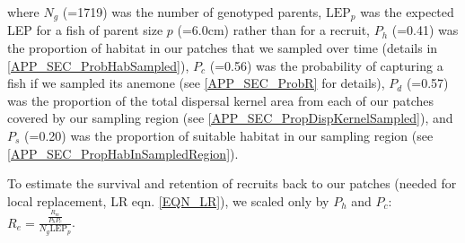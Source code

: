 \documentclass[12pt, oneside]{article}   	%
\begin{document}
where $N_g$ (=1719) was the number of genotyped parents, $\text{LEP}_p$ was the expected LEP for a fish of parent size $p$ (=6.0cm) rather than for a recruit, $P_h$ (=0.41) was the proportion of habitat in our patches that we sampled over time (details in \ref{APP_SEC_ProbHabSampled}), $P_c$ (=0.56) was the probability of capturing a fish if we sampled its anemone (see \ref{APP_SEC_ProbR} for details), $P_d$ (=0.57) was the proportion of the total dispersal kernel area from each of our patches covered by our sampling region (see \ref{APP_SEC_PropDispKernelSampled}), and $P_s$ (=0.20) was the proportion of suitable habitat in our sampling region (see \ref{APP_SEC_PropHabInSampledRegion}).

To estimate the survival and retention of recruits back to our patches (needed for local replacement, LR eqn. \ref{EQN_LR}), we scaled only by $P_h$ and $P_c$: $R_e = \frac{\frac{R_m}{P_h P_c}}{N_g \text{LEP}_p}$.


\end{document}
